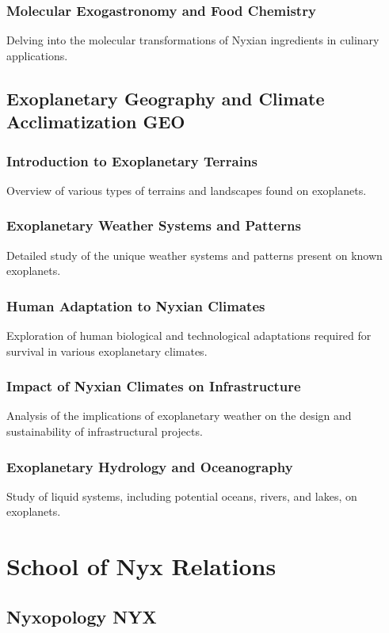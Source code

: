 \subsubsection{Molecular Exogastronomy and Food Chemistry}
Delving into the molecular transformations of Nyxian ingredients in culinary applications.


\subsection{Exoplanetary Geography and Climate Acclimatization \hfill GEO}
\subsubsection{Introduction to Exoplanetary Terrains}
Overview of various types of terrains and landscapes found on exoplanets.
\subsubsection{Exoplanetary Weather Systems and Patterns}
Detailed study of the unique weather systems and patterns present on known exoplanets.
\subsubsection{Human Adaptation to Nyxian Climates}
Exploration of human biological and technological adaptations required for survival in various exoplanetary climates.
\subsubsection{Impact of Nyxian Climates on Infrastructure}
Analysis of the implications of exoplanetary weather on the design and sustainability of infrastructural projects.
\subsubsection{Exoplanetary Hydrology and Oceanography}
Study of liquid systems, including potential oceans, rivers, and lakes, on exoplanets.


\section{School of Nyx Relations}


\subsection{Nyxopology \hfill NYX}
